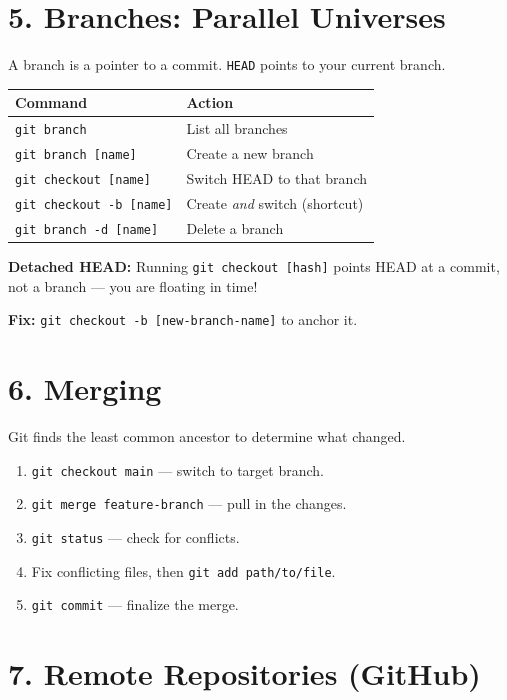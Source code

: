 \documentclass[10pt,a4paper]{article}
\newcommand{\cmd}[1]{\texttt{\small #1}}
\begin{document}
\section*{5. Branches: Parallel Universes}

A branch is a pointer to a commit. \cmd{HEAD} points to your current branch.

\begin{tabular}{@{}p{3.8cm}p{3.8cm}@{}}
\toprule
\textbf{Command} & \textbf{Action} \\
\midrule
\cmd{git branch} & List all branches \\
\cmd{git branch [name]} & Create a new branch \\
\cmd{git checkout [name]} & Switch HEAD to that branch \\
\cmd{git checkout -b [name]} & Create \emph{and} switch (shortcut) \\
\cmd{git branch -d [name]} & Delete a branch \\
\bottomrule
\end{tabular}

\vspace{3pt}
\textbf{Detached HEAD:} Running \cmd{git checkout [hash]} points HEAD at a commit, not a branch --- you are floating in time!

\textbf{Fix:} \cmd{git checkout -b [new-branch-name]} to anchor it.

\section*{6. Merging}

Git finds the least common ancestor to determine what changed.

\begin{enumerate}[noitemsep, topsep=1pt, leftmargin=*]
  \item \cmd{git checkout main} --- switch to target branch.
  \item \cmd{git merge feature-branch} --- pull in the changes.
  \item \cmd{git status} --- check for conflicts.
  \item Fix conflicting files, then \cmd{git add path/to/file}.
  \item \cmd{git commit} --- finalize the merge.
\end{enumerate}

\section*{7. Remote Repositories (GitHub)}
\end{document}
